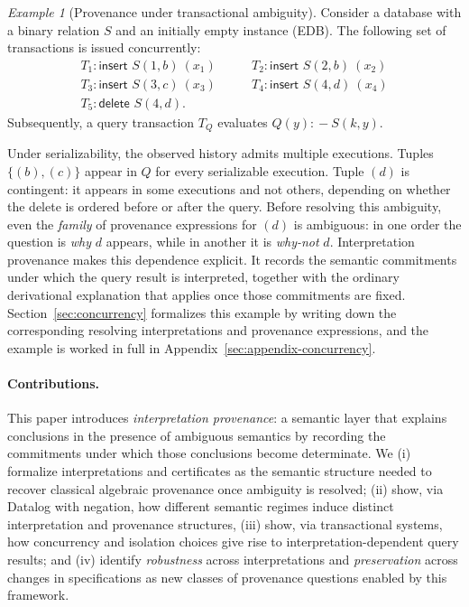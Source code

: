 \documentclass[acmsmall,nonacm]{acmart}
\theoremstyle{remark}
\newtheorem{example}{Example}
\numberwithin{definition}{section}
\numberwithin{theorem}{section}
\numberwithin{lemma}{section}
\numberwithin{corollary}{section}
\numberwithin{remark}{section}
\numberwithin{example}{section}
\numberwithin{observation}{section}
\numberwithin{assumption}{section}
\newcommand{\drule}{\mathrel{:\!-}}
\begin{document}
\begin{example}[Provenance under transactional ambiguity]
  \label{ex:example}
Consider a database with a binary relation $S$ 
and an initially empty instance (EDB).
The following set of transactions is issued concurrently:
\[
\begin{array}{ll}
T_1: \textsf{insert } S(1,b) \ (x_1) \qquad &
T_2: \textsf{insert } S(2,b) \ (x_2)\\
T_3: \textsf{insert } S(3,c) \ (x_3) \qquad &
T_4: \textsf{insert } S(4,d) \ (x_4)\\
T_5: \textsf{delete } S(4,d). &
\end{array}
\]
Subsequently, a query transaction $T_Q$ evaluates $Q(y) \drule S(k,y)$.

Under serializability, the observed history admits multiple executions.
Tuples $\{(b), (c)\}$ appear in $Q$ for every serializable execution.
Tuple $(d)$ is contingent: it appears in some executions and not others, depending
on whether the delete is ordered before or after the query. Before resolving this
ambiguity, even the \emph{family} of provenance expressions for $(d)$ is ambiguous:
in one order the question is \emph{why} $d$ appears, while in another it is \emph{why-not} $d$.
Interpretation provenance makes this dependence explicit.
It records the semantic commitments under which the query result is interpreted,
together with the ordinary derivational explanation that applies once those
commitments are fixed.
Section~\ref{sec:concurrency} formalizes this example by writing down the corresponding
resolving interpretations and provenance expressions, and the example is 
worked in full in Appendix~\ref{sec:appendix-concurrency}.
\end{example}

\paragraph{Contributions.}
This paper introduces \emph{interpretation provenance}: a semantic layer that
explains conclusions in the presence of ambiguous semantics by recording the
commitments under which those conclusions become determinate.
We (i) formalize interpretations and certificates as the semantic structure
needed to recover classical algebraic provenance once ambiguity is resolved;
(ii) show, via Datalog with negation, how different semantic regimes induce
distinct interpretation and provenance structures, (iii) show, via transactional
systems, how concurrency and isolation choices give rise to interpretation-dependent
query results; and (iv) identify \emph{robustness} across interpretations and
\emph{preservation} across changes in specifications
as new classes of provenance questions enabled by this framework.
\end{document}
